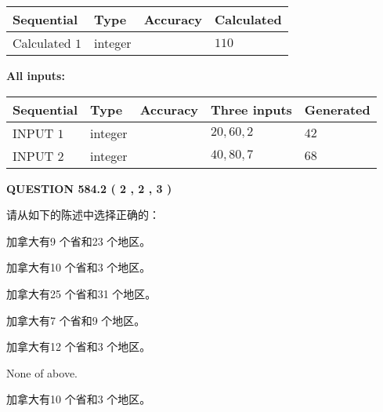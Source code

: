 \documentclass{ctexart}
\begin{document}
  
\noindent\begin{tabular}{|l|l|l|l|}
\hline
 Sequential & Type & Accuracy & Calculated \\ 
\hline
 
 
  Calculated $  1 $ & integer &  & 
  $ 110 $ 
 \\  \hline  
 \end{tabular}
   
   
   
   
\noindent\vspace{0.1in}\hspace{-0.08in} {\textbf{\Large{All inputs: }}}
   
   
  
  
\noindent\begin{tabular}{|l|l|l|l|l|}
\hline
 Sequential & Type & Accuracy & Three inputs & Generated \\ 
\hline
 
 
  INPUT $  1 $ & integer &  & $
 20
 , 
 60
 , 
 2
 $ & $ 42 $ 
 \\  \hline  
 
 
  INPUT $  2 $ & integer &  & $
 40
 , 
 80
 , 
 7
 $ & $ 68 $ 
 \\  \hline  
 \end{tabular}
   
   
  
\vspace{0.2in}
  
{\textbf{\Large{QUESTION
584.2 
 ( 2 , 2 , 3 )
}}}
  
  
请从如下的陈述中选择正确的：
 
 
加拿大有9 个省和23 个地区。
 
 
加拿大有10 个省和3 个地区。
 
 
加拿大有25 个省和31 个地区。
 
 
加拿大有7 个省和9 个地区。
 
 
加拿大有12 个省和3 个地区。
 
 
 None of above.
 
 
\noindent{}
 
 
加拿大有10 个省和3 个地区。
 
 
\noindent{}
 
\end{document}

